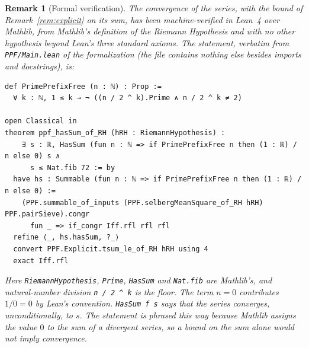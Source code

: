 \documentclass[11pt]{amsart}
\newtheorem{remark}[lemma]{Remark}
\begin{document}
\begin{remark}[Formal verification]
\label{rem:lean}
The convergence of the series, with the bound of
Remark~\ref{rem:explicit} on its sum, has been machine-verified in Lean~4
over Mathlib, from Mathlib's definition of the Riemann Hypothesis and with
no other hypothesis beyond Lean's three standard axioms. The statement,
verbatim from \texttt{PPF/Main.lean} of the formalization (the file
contains nothing else besides imports and docstrings), is:

\noindent\begin{minipage}{\linewidth}
\begin{lstlisting}
def PrimePrefixFree (n : ℕ) : Prop :=
  ∀ k : ℕ, 1 ≤ k → ¬ ((n / 2 ^ k).Prime ∧ n / 2 ^ k ≠ 2)

open Classical in
theorem ppf_hasSum_of_RH (hRH : RiemannHypothesis) :
    ∃ s : ℝ, HasSum (fun n : ℕ => if PrimePrefixFree n then (1 : ℝ) / n else 0) s ∧
      s ≤ Nat.fib 72 := by
  have hs : Summable (fun n : ℕ => if PrimePrefixFree n then (1 : ℝ) / n else 0) :=
    (PPF.summable_of_inputs (PPF.selbergMeanSquare_of_RH hRH) PPF.pairSieve).congr
      fun _ => if_congr Iff.rfl rfl rfl
  refine ⟨_, hs.hasSum, ?_⟩
  convert PPF.Explicit.tsum_le_of_RH hRH using 4
  exact Iff.rfl
\end{lstlisting}
\end{minipage}

Here \texttt{RiemannHypothesis}, \texttt{Prime}, \texttt{HasSum} and
\texttt{Nat.fib} are Mathlib's, and natural-number division \texttt{n / 2 \^{} k} is the
floor. The term $n = 0$ contributes $1/0 = 0$ by Lean's convention.
\texttt{HasSum f s} says that the series converges, unconditionally, to
$s$. The statement is phrased this way because Mathlib assigns the value
$0$ to the sum of a divergent series, so a bound on the sum alone would
not imply convergence.


\end{remark}
\end{document}
